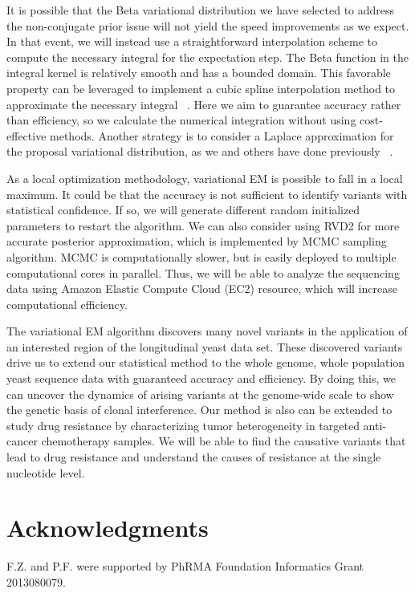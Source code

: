 \documentclass[11pt,reqno]{amsart}
\begin{document}
It is possible that the Beta variational distribution we have selected to address the non-conjugate prior issue will not yield the speed improvements as we expect.
In that event, we will instead use a straightforward interpolation scheme to compute the necessary integral for the expectation step.
The Beta function in the integral kernel is relatively smooth and has a bounded domain.
This favorable property can be leveraged to implement a cubic spline interpolation method to approximate the necessary integral ~\citep{mckinley1998cubic}.
Here we aim to guarantee accuracy rather than efficiency, so we calculate the numerical integration without using cost-effective methods.
Another strategy is to consider a Laplace approximation for the proposal variational distribution, as we and others have done previously ~\citep{saddiki2014glad, wang2013variational}.

As a local optimization methodology, variational EM is possible to fall in a local maximum.
It could be that the accuracy is not sufficient to identify variants with statistical confidence.
If so, we will generate different random initialized parameters to restart the algorithm.
We can also consider using RVD2 for more accurate posterior approximation, which is implemented by MCMC sampling algorithm.
MCMC is computationally slower, but is easily deployed to multiple computational cores in parallel.
Thus, we will be able to analyze the sequencing data using Amazon Elastic Compute Cloud (EC2) resource, which will increase computational efficiency.

The variational EM algorithm discovers many novel variants in the application of an interested region of the longitudinal yeast data set.
These discovered variants drive us to extend our statistical method to the whole genome, whole population yeast sequence data with guaranteed accuracy and efficiency.
By doing this, we can uncover the dynamics of arising variants at the genome-wide scale to show the genetic basis of clonal interference.
Our method is also can be extended to study drug resistance by characterizing tumor heterogeneity in targeted anti-cancer chemotherapy samples.
We will be able to find the causative variants that lead to drug resistance and understand the causes of resistance at the single nucleotide level.
\section{Acknowledgments}
F.Z. and P.F. were supported by PhRMA Foundation Informatics Grant 2013080079.
%
\appendix
\end{document}
